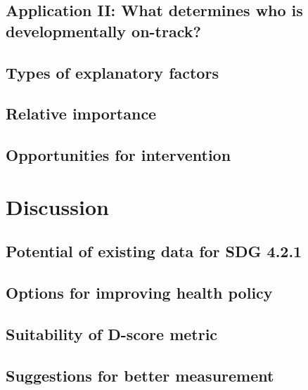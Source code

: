 \documentclass[]{book}
\theoremstyle{definition}
\theoremstyle{definition}
\theoremstyle{definition}
\theoremstyle{remark}
\begin{document}
\section{Application II: What determines who is developmentally
on-track?}\label{application-ii-what-determines-who-is-developmentally-on-track}

\section{Types of explanatory
factors}\label{types-of-explanatory-factors}

\section{Relative importance}\label{relative-importance}

\section{Opportunities for
intervention}\label{opportunities-for-intervention}

\chapter{Discussion}\label{ch:discussion2}

\section{Potential of existing data for SDG
4.2.1}\label{potential-of-existing-data-for-sdg-4.2.1}

\section{Options for improving health
policy}\label{options-for-improving-health-policy}

\section{Suitability of D-score
metric}\label{suitability-of-d-score-metric}

\section{Suggestions for better
measurement}\label{suggestions-for-better-measurement}


\end{document}
